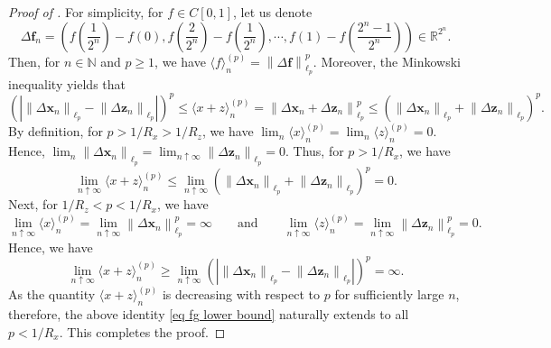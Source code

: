 \documentclass[12pt,reqno]{article}
\newcommand{\norm}[1]{\left\lVert {#1}\right\rVert}
\def\ua{\uparrow}
\numberwithin{equation}{section}
\theoremstyle{definition}
\def\<{\langle}
\def\>{\rangle}
\def\ua{\uparrow}
\newcommand{\bR}{\mathbb{R}}
\newcommand{\bN}{\mathbb{N}}
\begin{document}
\begin{proof}[Proof of ] 
For simplicity, for $f \in C[0,1]$, let us denote 
	\begin{equation*}
		\Delta \bm f_n = \left(f\left(\frac{1}{2^n}\right)-f(0), f\left(\frac{2}{2^n}\right)-f\left(\frac{1}{2^n}\right), \cdots, f(1)-f\left(\frac{2^n-1}{2^n}\right)\right) \in \bR^{2^n}.
	\end{equation*}
	Then, for $n \in \bN$ and $p \ge 1$, we have $\<f\>^{(p)}_n = \norm{\Delta \bm f}_{\ell_p}^p$. Moreover, the Minkowski inequality yields that 
	\begin{equation*}
		\left(\left|\norm{\Delta \bm x_n}_{\ell_p} - \norm{\Delta \bm z_n}_{\ell_p}\right|\right)^p
		\le \<x +z\>^{(p)}_n = \norm{\Delta \bm x_n + \Delta \bm z_n}^p_{\ell_p} \le \left(\norm{\Delta \bm x_n}_{\ell_p} + \norm{\Delta \bm z_n}_{\ell_p}\right)^p. 
	\end{equation*}
	By definition, for $p > 1/{R_x} > 1/{R_z}$, we have $\lim_{n} \<x\>^{(p)}_n = \lim_{n}\<z\>^{(p)}_n = 0$. Hence,  $\lim_{n} \norm{\Delta \bm x_n}_{\ell_p} = \lim_{n \ua \infty}\norm{\Delta \bm z_n}_{\ell_p} = 0$.
	Thus, for $p > 1/{R_x}$, we have 
	\begin{equation*}
		\lim_{n \ua \infty}\<x + z\>^{(p)}_n \le \lim_{n \ua \infty}\left(\norm{\Delta \bm x_n}_{\ell_p} + \norm{\Delta \bm z_n}_{\ell_p}\right)^p = 0.
	\end{equation*}
	Next, for $1/{R_z} < p < 1/{R_x}$, we have 
	\begin{equation*}
		\lim_{n \ua \infty} \<x\>^{(p)}_n = \lim_{n \ua \infty}\norm{\Delta \bm x_n}_{\ell_p}^p = \infty \qquad \text{and} \qquad \lim_{n \ua \infty} \<z\>^{(p)}_n = \lim_{n \ua \infty}\norm{\Delta \bm z_n}_{\ell_p}^p = 0.
	\end{equation*}
	Hence, we have 
	\begin{equation}\label{eq fg lower bound}
		\lim_{n \ua \infty}\<x + z\>^{(p)}_n \ge \lim_{n \ua \infty} \left(\left|\norm{\Delta \bm x_n}_{\ell_p} - \norm{\Delta \bm z_n}_{\ell_p}\right|\right)^p = \infty.
	\end{equation}
	As the quantity $\<x+z\>^{(p)}_n$ is decreasing with respect to $p$ for sufficiently large $n$, therefore, the above identity \eqref{eq fg lower bound} naturally extends to all $p < {1}/{R_x}$. This completes the proof. 
\end{proof}
\end{document}
